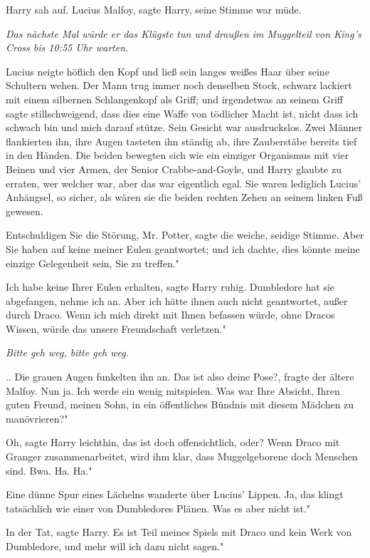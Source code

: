 Harry sah auf. \glqq Lucius Malfoy\grqq{}, sagte Harry, seine Stimme war müde.

\emph{Das nächste Mal würde er das Klügste tun und draußen im Muggelteil von King's Cross bis 10:55 Uhr warten.}

Lucius neigte höflich den Kopf und ließ sein langes weißes Haar über seine
Schultern wehen. Der Mann trug immer noch denselben Stock, schwarz lackiert mit
einem silbernen Schlangenkopf als Griff; und irgendetwas an seinem Griff sagte
stillschweigend, dass dies eine Waffe von tödlicher Macht ist, nicht dass ich
schwach bin und mich darauf stütze. Sein Gesicht war ausdruckslos. Zwei Männer
flankierten ihn, ihre Augen tasteten ihn ständig ab, ihre Zauberstäbe bereits
tief in den Händen. Die beiden bewegten sich wie ein einziger Organismus mit
vier Beinen und vier Armen, der Senior Crabbe-and-Goyle, und Harry glaubte zu
erraten, wer welcher war, aber das war eigentlich egal. Sie waren lediglich
Lucius' Anhängsel, so sicher, als wären sie die beiden rechten Zehen an seinem
linken Fuß gewesen.

\glqq Entschuldigen Sie die Störung, Mr. Potter\grqq{}, sagte die weiche,
seidige Stimme. \glqq Aber Sie haben auf keine meiner Eulen geantwortet; und ich
dachte, dies könnte meine einzige Gelegenheit sein, Sie zu treffen."

\glqq Ich habe keine Ihrer Eulen erhalten\grqq{}, sagte Harry ruhig. \glqq
Dumbledore hat sie abgefangen, nehme ich an. Aber ich hätte ihnen auch nicht
geantwortet, außer durch Draco. Wenn ich mich direkt mit Ihnen befassen würde,
ohne Dracos Wissen, würde das unsere Freundschaft verletzen."

\emph{ Bitte geh weg, bitte geh weg.}

.. Die grauen Augen funkelten ihn an. \glqq Das ist also deine Pose?\grqq{},
fragte der ältere Malfoy. \glqq Nun ja. Ich werde ein wenig mitspielen. Was war
Ihre Absicht, Ihren guten Freund, meinen Sohn, in ein öffentliches Bündnis mit
diesem Mädchen zu manövrieren?"

\glqq Oh\grqq{}, sagte Harry leichthin, \glqq das ist doch offensichtlich, oder?
Wenn Draco mit Granger zusammenarbeitet, wird ihm klar, dass Muggelgeborene doch
Menschen sind. Bwa. Ha. Ha."

Eine dünne Spur eines Lächelns wanderte über Lucius' Lippen. \glqq Ja, das
klingt tatsächlich wie einer von Dumbledores Plänen. Was es aber nicht ist."

\glqq In der Tat\grqq{}, sagte Harry. \glqq Es ist Teil meines Spiels mit Draco
und kein Werk von Dumbledore, und mehr will ich dazu nicht sagen."

